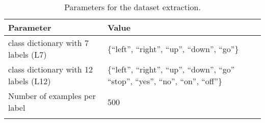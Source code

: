 \begin{table}[ht!]
\begin{center}
\caption{Parameters for the dataset extraction.}
\begin{tabular}{ M{7cm}  M{6cm}}
\toprule
\textbf{Parameter} & \textbf{Value} \\
\midrule
class dictionary with 7 labels (L7) & \{\enquote{left},  \enquote{right}, \enquote{up}, \enquote{down}, \enquote{go}\}\\
class dictionary with 12 labels (L12) & \{\enquote{left},  \enquote{right}, \enquote{up}, \enquote{down}, \enquote{go}\, \enquote{stop}, \enquote{yes}, \enquote{no}, \enquote{on}, \enquote{off}\}\\
\midrule
Number of examples per label & 500 \\ 
\bottomrule
\label{tab:exp_details_params_dataset}
\end{tabular}
\end{center}
\vspace{-4mm}
\end{table}
\FloatBarrier
\noindent